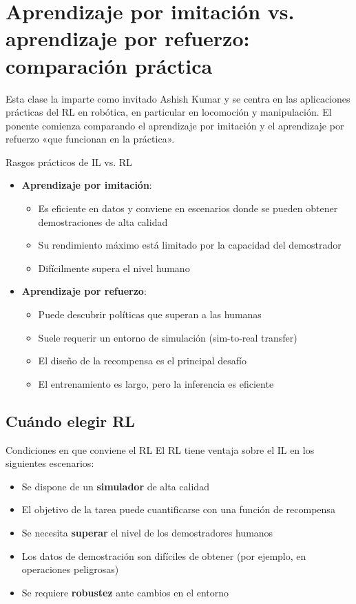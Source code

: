 \section{Aprendizaje por imitación vs. aprendizaje por refuerzo: comparación práctica}

Esta clase la imparte como invitado Ashish Kumar y se centra en las aplicaciones prácticas del RL en robótica, en particular en locomoción y manipulación. El ponente comienza comparando el aprendizaje por imitación y el aprendizaje por refuerzo «que funcionan en la práctica».

\begin{importantbox}{Rasgos prácticos de IL vs. RL}
\begin{itemize}
    \item \textbf{Aprendizaje por imitación}:
    \begin{itemize}
        \item Es eficiente en datos y conviene en escenarios donde se pueden obtener demostraciones de alta calidad
        \item Su rendimiento máximo está limitado por la capacidad del demostrador
        \item Difícilmente supera el nivel humano
    \end{itemize}
    \item \textbf{Aprendizaje por refuerzo}:
    \begin{itemize}
        \item Puede descubrir políticas que superan a las humanas
        \item Suele requerir un entorno de simulación (sim-to-real transfer)
        \item El diseño de la recompensa es el principal desafío
        \item El entrenamiento es largo, pero la inferencia es eficiente
    \end{itemize}
\end{itemize}
\end{importantbox}

\subsection{Cuándo elegir RL}

\begin{knowledgebox}{Condiciones en que conviene el RL}
El RL tiene ventaja sobre el IL en los siguientes escenarios:
\begin{itemize}
    \item Se dispone de un \textbf{simulador} de alta calidad
    \item El objetivo de la tarea puede cuantificarse con una función de recompensa
    \item Se necesita \textbf{superar} el nivel de los demostradores humanos
    \item Los datos de demostración son difíciles de obtener (por ejemplo, en operaciones peligrosas)
    \item Se requiere \textbf{robustez} ante cambios en el entorno
\end{itemize}
\end{knowledgebox}

